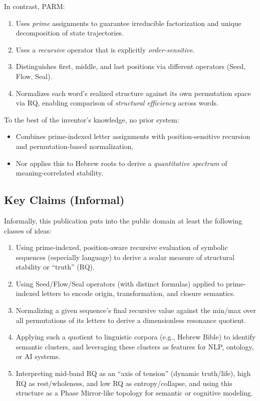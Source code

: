 \documentclass[11pt]{article}
\begin{document}
In contrast, PARM:
\begin{enumerate}[label=(\roman*)]
    \item Uses \emph{prime} assignments to guarantee irreducible factorization and unique decomposition of state trajectories.\cite{primeindexing,primeanchor}
    \item Uses a \emph{recursive} operator that is explicitly \emph{order-sensitive}.
    \item Distinguishes first, middle, and last positions via different operators (Seed, Flow, Seal).
    \item Normalizes each word's realized structure against its own permutation space via RQ, enabling comparison of \emph{structural efficiency} across words.
\end{enumerate}

To the best of the inventor's knowledge, no prior system:
\begin{itemize}
    \item Combines prime-indexed letter assignments with position-sensitive recursion and permutation-based normalization,
    \item Nor applies this to Hebrew roots to derive a \emph{quantitative spectrum} of meaning-correlated stability.
\end{itemize}

\subsection{Key Claims (Informal)}

Informally, this publication puts into the public domain at least the following classes of ideas:

\begin{enumerate}
    \item Using prime-indexed, position-aware recursive evaluation of symbolic sequences (especially language) to derive a scalar measure of structural stability or ``truth'' (RQ).
    \item Using Seed/Flow/Seal operators (with distinct formulas) applied to prime-indexed letters to encode origin, transformation, and closure semantics.
    \item Normalizing a given sequence's final recursive value against the min/max over all permutations of its letters to derive a dimensionless resonance quotient.
    \item Applying such a quotient to linguistic corpora (e.g., Hebrew Bible) to identify semantic clusters, and leveraging these clusters as features for NLP, ontology, or AI systems.
    \item Interpreting mid-band RQ as an ``axis of tension'' (dynamic truth/life), high RQ as rest/wholeness, and low RQ as entropy/collapse, and using this structure as a Phase Mirror-like topology for semantic or cognitive modeling.
\end{enumerate}
\end{document}
